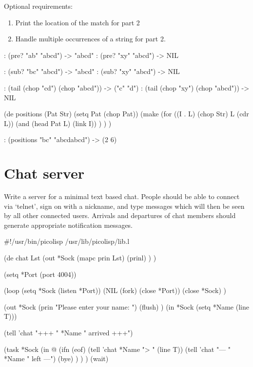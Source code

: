 Optional requirements:

\begin{enumerate}
\item
  Print the location of the match for part 2
\item
  Handle multiple occurrences of a string for part 2.
\end{enumerate}



\begin{wideverbatim}

: (pre? "ab" "abcd")
-> "abcd"
: (pre? "xy" "abcd")
-> NIL

: (sub? "bc" "abcd")
-> "abcd"
: (sub? "xy" "abcd")
-> NIL

: (tail (chop "cd") (chop "abcd"))
-> ("c" "d")
: (tail (chop "xy") (chop "abcd"))
-> NIL


(de positions (Pat Str)
   (setq Pat (chop Pat))
   (make
      (for ((I . L) (chop Str) L (cdr L))
         (and (head Pat L) (link I)) ) ) )

: (positions "bc" "abcdabcd")
-> (2 6)

\end{wideverbatim}

\pagebreak{}
\section*{Chat server}

Write a server for a minimal text based chat. People should be able to
connect via `telnet', sign on with a nickname, and type messages which
will then be seen by all other connected users. Arrivals and departures
of chat members should generate appropriate notification messages.



\begin{wideverbatim}

#!/usr/bin/picolisp /usr/lib/picolisp/lib.l
 
(de chat Lst
   (out *Sock
      (mapc prin Lst)
      (prinl) ) )
 
(setq *Port (port 4004))
 
(loop
   (setq *Sock (listen *Port))
   (NIL (fork) (close *Port))
   (close *Sock) )
 
(out *Sock
   (prin "Please enter your name: ")
   (flush) )
(in *Sock (setq *Name (line T)))
 
(tell 'chat "+++ " *Name " arrived +++")
 
(task *Sock
   (in @
      (ifn (eof)
         (tell 'chat *Name "> " (line T))
         (tell 'chat "--- " *Name " left ---")
         (bye) ) ) )
(wait)

\end{wideverbatim}

